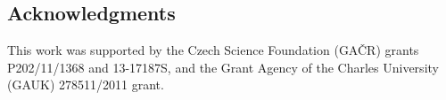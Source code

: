 \documentclass{itatnew}
\begin{document}
% 
% 
% 





\subsection*{Acknowledgments}

This work was supported by the Czech Science Foundation (GA\v{C}R) grants \hbox{P202/11/1368} and \hbox{13-17187S}, and the Grant Agency of the Charles University (GAUK) \hbox{278511/2011} grant. 

%
%


% 
% 
% 
% 
% 
\end{document}
